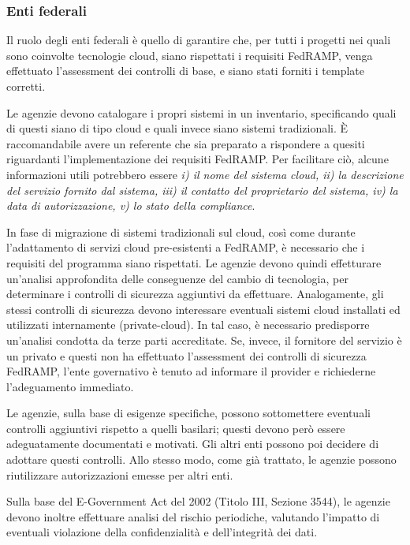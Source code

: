\documentclass[../main.tex]{subfiles}
\begin{document}
\subsubsection{Enti federali}
Il ruolo degli enti federali è quello di garantire che, per tutti i progetti nei quali sono coinvolte tecnologie cloud, siano rispettati i requisiti FedRAMP, venga effettuato l'assessment dei controlli di base, e siano stati forniti i template corretti.


Le agenzie devono catalogare i propri sistemi in un inventario, specificando quali di questi siano di tipo cloud e quali invece siano sistemi tradizionali. È raccomandabile avere un referente che sia preparato a rispondere a quesiti riguardanti l'implementazione dei requisiti FedRAMP.
Per facilitare ciò, alcune informazioni utili potrebbero essere \textit{i) il nome del sistema cloud, ii) la descrizione del servizio fornito dal sistema, iii) il contatto del proprietario del sistema, iv) la data di autorizzazione, v) lo stato della compliance}\cite{fedrampFramework}.


In fase di migrazione di sistemi tradizionali sul cloud, così come durante l'adattamento di servizi cloud pre-esistenti a FedRAMP, è necessario che i requisiti del programma siano rispettati. Le agenzie devono quindi effetturare un'analisi approfondita delle conseguenze del cambio di tecnologia, per determinare i controlli di sicurezza aggiuntivi da effettuare.
Analogamente, gli stessi controlli di sicurezza devono interessare eventuali sistemi cloud installati ed utilizzati internamente (private-cloud). In tal caso, è necessario predisporre un'analisi condotta da terze parti accreditate.
Se, invece, il fornitore del servizio è un privato e questi non ha effettuato l'assessment dei controlli di sicurezza FedRAMP, l'ente governativo è tenuto ad informare il provider e richiederne l'adeguamento immediato. 

Le agenzie, sulla base di esigenze specifiche, possono sottomettere eventuali controlli aggiuntivi rispetto a quelli basilari; questi devono però essere adeguatamente documentati e motivati. Gli altri enti possono poi decidere di adottare questi controlli.
Allo stesso modo, come già trattato, le agenzie possono riutilizzare autorizzazioni emesse per altri enti.

Sulla base del E-Government Act del 2002 (Titolo III, Sezione 3544), le agenzie devono inoltre effettuare analisi del rischio periodiche, valutando l'impatto di eventuali violazione della confidenzialità e dell'integrità dei dati\cite{fedrampFramework}.
\end{document}
